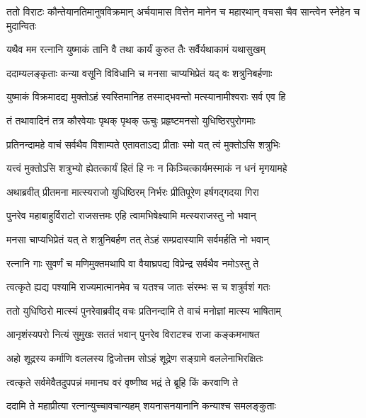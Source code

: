 \threelineshloka
{ततो विराटः कौन्तेयानतिमानुषविक्रमान्}
{अर्चयामास वित्तेन मानेन च महारथान्}
{वचसा चैव सान्त्वेन स्नेहेन च मुदान्वितः}




\twolineshloka
{यथैव मम रत्नानि युष्माकं तानि वै तथा}
{कार्यं कुरुत तैः सर्वैर्यथाकामं यथासुखम्}


\twolineshloka
{ददाम्यलङ्कृताः कन्या वसूनि विविधानि च}
{मनसा चाप्यभिप्रेतं यद् वः शत्रुनिबर्हणाः}


\twolineshloka
{युष्माकं विक्रमादद्य मुक्तोऽहं स्वस्तिमानिह}
{तस्माद्भवन्तो मत्स्यानामीश्वराः सर्व एव हि}



\twolineshloka
{तं तथावादिनं तत्र कौरवेयाः पृथक् पृथक्}
{ऊचुः प्रहृष्टमनसो युधिष्ठिरपुरोगमाः}


\twolineshloka
{प्रतिनन्दामहे वाचं सर्वथैव विशाम्पते}
{एतावताऽद्य प्रीताः स्मो यत् त्वं मुक्तोऽसि शत्रुभिः}


\twolineshloka
{यत्त्वं मुक्तोऽसि शत्रुभ्यो ह्येतत्कार्यं हितं हि नः}
{न किञ्चित्कार्यमस्माकं न धनं मृगयामहे}


\twolineshloka
{अथाब्रवीत् प्रीतमना मात्स्यराजो युधिष्ठिरम्}
{निर्भरः प्रीतिपूरेण हर्षगद्गदया गिरा}


\twolineshloka
{पुनरेव महाबाहुर्विराटो राजसत्तमः}
{एहि त्वामभिषेक्ष्यामि मत्स्यराजस्तु नो भवान्}


\twolineshloka
{मनसा चाप्यभिप्रेतं यत् ते शत्रुनिबर्हण}
{तत् तेऽहं सम्प्रदास्यामि सर्वमर्हति नो भवान्}


\twolineshloka
{रत्नानि गाः सुवर्णं च मणिमुक्तमथापि वा}
{वैयाघ्रपद्य विप्रेन्द्र सर्वथैव नमोऽस्तु ते}


\twolineshloka
{त्वत्कृते ह्यद्य पश्यामि राज्यमात्मानमेव च}
{यतश्च जातः संरम्भः स च शत्रुर्वशं गतः}


\twolineshloka
{ततो युधिष्ठिरो मात्स्यं पुनरेवाब्रवीद् वचः}
{प्रतिनन्दामि ते वाचं मनोज्ञां मात्स्य भाषिताम्}


\twolineshloka
{आनृशंस्यपरो नित्यं सुमुखः सततं भवान्}
{पुनरेव विराटश्च राजा कङ्कमभाषत}


\twolineshloka
{अहो शूद्रस्य कर्माणि वललस्य द्विजोत्तम}
{सोऽहं शूद्रेण सङ्ग्रामे वललेनाभिरक्षितः}


\twolineshloka
{त्वत्कृते सर्वमेवैतदुपपन्नं ममानघ}
{वरं वृष्णीष्व भद्रं ते ब्रूहि किं करवाणि ते}


\twolineshloka
{ददामि ते महाप्रीत्या रत्नान्युच्चावचान्यहम्}
{शयनासनयानानि कन्याश्च समलङ्कुताः}


